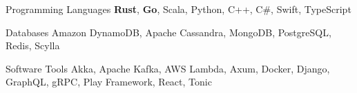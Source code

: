

\begin{cvskills}

  \cvskill
    {Programming Languages} %
    {{\bf Rust}, {\bf Go}, Scala, Python, C++, C\#, Swift, TypeScript} %

  \cvskill
    {Databases} %
    {Amazon DynamoDB, Apache Cassandra, MongoDB, PostgreSQL, Redis, Scylla} %

  \cvskill
    {Software Tools} %
    {Akka, Apache Kafka, AWS Lambda, Axum, Docker, Django, GraphQL, gRPC, Play Framework, React, Tonic} %

\end{cvskills}
